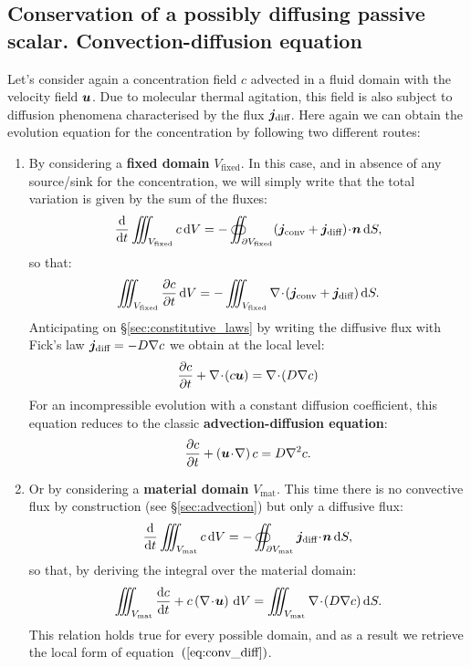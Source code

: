 \subsection{Conservation of a possibly diffusing passive scalar. Convection-diffusion equation}
Let's consider again a concentration field $c$ advected in a fluid domain with the velocity field $\bu$. Due to molecular thermal agitation, this field is also subject to diffusion phenomena characterised by the flux $\bj_\text{diff}$. Here again we can obtain the evolution equation for the concentration by following two different routes:
\begin{enumerate}
\item By considering a \textbf{fixed domain} $V_\text{fixed}$. In this case, and in absence of any source/sink for the concentration, we will simply write that the total variation is given by the sum of the fluxes:
$$
\dd{}{t} \iiint_{V_\text{fixed}} c \, \dV = - \oiint_{\partial V_\text{fixed}} (\bj_\text{conv} + \bj_\text{diff}) \!\cdot\!\bn\,\dS,
$$
so that: 
$$
\iiint_{V_\text{fixed}} \pd{c}{t} \, \dV = - \iiint_{V_\text{fixed}} \nabla \!\cdot\! (\bj_\text{conv} + \bj_\text{diff})\,\dS.
$$
Anticipating on \S \ref{sec:constitutive_laws} by writing the diffusive flux with Fick's law $\bj_\text{diff} = - D \nabla c$ we obtain at the local level:
\begin{equation}
\pd{c}{t} + \nabla \!\cdot\! \lp c\bu\rp = \nabla \!\cdot\! (D \nabla c) 
\label{eq:conv_diff}
\end{equation}
For an incompressible evolution with a constant diffusion coefficient, this equation reduces to the classic \textbf{advection-diffusion equation}:
\begin{equation}
\pd{c}{t} + \lp\bu\!\cdot\!\nabla\rp c = D \nabla^2 c.
\label{eq:conv_diff_incompressible}
\end{equation}
\item Or by considering a \textbf{material domain} $V_\text{mat}$. This time there is no convective flux by construction (see \S\ref{sec:advection}) but only a diffusive flux: 
$$
\dd{}{t} \iiint_{V_\text{mat}} c \, \dV = - \oiint_{\partial V_\text{mat}} \bj_\text{diff} \!\cdot\!\bn\,\dS,
$$
so that, by deriving the integral over the material domain:
$$
\iiint_{V_\text{mat}} \dd{c}{t} + c \lp\nabla\!\cdot\!\bu\rp \, \dV = \iiint_{V_\text{mat}} \nabla \!\cdot\! (D \nabla c)\,\dS.
$$
This relation holds true for every possible domain, and as a result we retrieve the local form of equation~$\left(\ref{eq:conv_diff}\right)$.
\end{enumerate}

